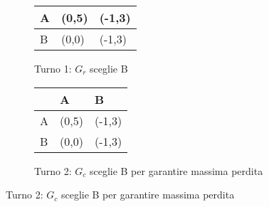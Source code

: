\documentclass[\main/main.tex]{subfiles}
\begin{document}
\begin{figure}
\begin{subfigure}{0.24\textwidth}
\begin{table}
\begin{tabular}{|L|L|L|}
        \hline
        A & (0,5)                     & (-1,3)                    \\
        \hline
        B &  (0,0) & (-1,3) \\
        \hline
      \end{tabular}
    \end{table}
    \caption{Turno 1: $G_r$ sceglie B}
  \end{subfigure}
  \begin{subfigure}{0.24\textwidth}
    \begin{table}
      \begin{tabular}{|L|L|L|}
        \hline
          & A                         & B                            \\
        \hline
        A & (0,5)                     &  (-1,3)    \\
        \hline
        B &  (0,0) &  (-1,3) \\
        \hline
      \end{tabular}
    \end{table}
    \caption{Turno 2: $G_c$ sceglie B per garantire massima perdita}
  \end{subfigure}
\end{figure}
\end{document}
